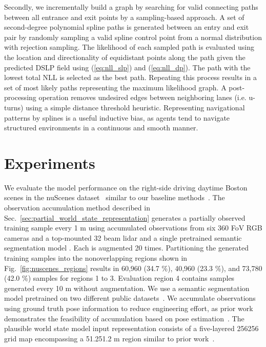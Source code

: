 \documentclass[letterpaper, 10 pt, conference]{ieeeconf}
\begin{document}
Secondly, we incrementally build a graph by searching for valid connecting paths between all entrance and exit points by a sampling-based approach. A set of second-degree polynomial spline paths is generated between an entry and exit pair by randomly sampling a valid spline control point  from a normal distribution with rejection sampling.
The likelihood of each sampled path is evaluated using the location and directionality of  equidistant points along the path given the predicted DSLP field using (\ref{eq:nll_slp}) and (\ref{eq:nll_dp}). The path with the lowest total NLL is selected as the best path. Repeating this process results in a set of most likely paths representing the maximum likelihood graph. A post-processing operation removes undesired edges between neighboring lanes (i.e. u-turns) using a simple distance threshold heuristic.
Representing navigational patterns by splines is a useful inductive bias, as agents tend to navigate structured environments in a continuous and smooth manner.

\section{Experiments}

We evaluate the model performance on the right-side driving daytime Boston scenes in the nuScenes dataset~\cite{caesar2020nuscenes} similar to our baseline methods~\cite{can2021stsu, zurn2021lanegraphnet}.
The observation accumulation method described in Sec.~\ref{sec:partial_world_state_representation} generates a partially observed training sample  every 1 m using accumulated observations from six 360 FoV RGB cameras and a top-mounted 32 beam lidar and a single pretrained semantic segmentation model \cite{karlsson2023pred_wm}. Each  is augmented 20 times. Partitioning the generated training samples into the nonoverlapping regions shown in Fig.~\ref{fig:nuscenes_regions} results in 60,960 (34.7 \%), 40,960 (23.3 \%), and 73,780 (42.0 \%) samples for regions 1 to 3. Evaluation region 4 contains samples generated every 10 m without augmentation. We use a semantic segmentation model pretrained on two different public datasets~\cite{karlsson2023pred_wm}. We accumulate observations using ground truth pose information to reduce engineering effort, as prior work demonstrates the feasibility of accumulation based on pose estimation~\cite{karlsson2023pred_wm}. The plausible world state model input representation  consists of a five-layered 256256 grid map encompassing a 51.251.2 m region similar to prior work~\cite{zurn2021lanegraphnet}. 
\end{document}
